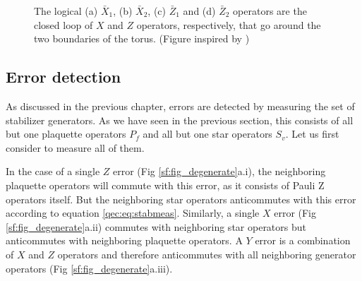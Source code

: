 \begin{figure}
  \centering
  \hspace{1cm}
  \caption{The logical (a) $\bar{X}_1$, (b) $\bar{X}_2$, (c) $\bar{Z}_1$ and (d) $\bar{Z}_2$ operators are the closed loop of $X$ and $Z$ operators, respectively, that go around the two boundaries of the torus. (Figure inspired by \cite{browne})}\label{sf:fig_logical}
\end{figure}

\subsection{Error detection}
As discussed in the previous chapter, errors are detected by measuring the set of stabilizer generators. As we have seen in the previous section, this consists of all but one plaquette operators $P_f$ and all but one star operators $S_v$. Let us first consider to measure all of them.

In the case of a single $Z$ error (Fig \ref{sf:fig_degenerate}a.i), the neighboring plaquette operators will commute with this error, as it consists of Pauli Z operators itself. But the neighboring star operators anticommutes with this error according to equation \ref{qec:eq:stabmeas}. Similarly, a single $X$ error (Fig \ref{sf:fig_degenerate}a.ii) commutes with neighboring star operators but anticommutes with neighboring plaquette operators. A $Y$ error is a combination of $X$ and $Z$ operators and therefore anticommutes with all neighboring generator operators (Fig \ref{sf:fig_degenerate}a.iii).

